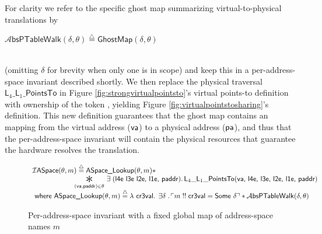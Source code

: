 For clarity we refer to the specific ghost map summarizing virtual-to-physical translations by \\
\centerline{$\mathcal{A}\textsf{bsPTableWalk}(\delta,\theta) \stackrel{\triangle}{=} \mathsf{GhostMap}(\delta,\theta)$}\\
(omitting $\delta$ for brevity when only one is in scope)
and keep this in a per-address-space invariant described shortly.
We then replace the physical traversal
 $\textsf{L}_{4}\_\textsf{L}_{1}\_\textsf{PointsTo}$ in Figure \ref{fig:strongvirtualpointsto}'s virtual points-to definition
with ownership of the token \ghostmaptoken{\delta}{\vaddr}{\paddr}, %
yielding Figure \ref{fig:virtualpointstosharing}'s definition.
This new definition guarantees that the ghost map contains an mapping from the virtual address ($\mathsf{va}$) to a physical address ($\textsf{pa}$),
and thus that the per-address-space invariant will contain the physical resources that guarantee the hardware resolves the translation.

  \begin{figure*}
  \footnotesize
\centerline{$
\begin{array}{l}
  \mathcal{I}\textsf{ASpace}(\ptablestore,m)\stackrel{\triangle}{=} \textsf{ASpace\_Lookup}(\ptablestore,m) \ast \\
 \qquad\qquad\qquad \bigast{(\vaddr, \textsf{paddr})\in \ptablestore}{\exists\;(\textsf{l4e l3e l2e, l1e, paddr})\ldotp \textsf{L}_{4}\_\textsf{L}_{1}\_\textsf{PointsTo}(\vaddr\textsf{, l4e, l3e, l2e, l1e, paddr})} \\
  \textsf{ where } 
   \textsf{ASpace\_Lookup} (\ptablestore,m) \stackrel{\triangle}{=} \lambda\textsf{ cr3val} \ldotp \; \exists \gammaPred \; \ldotp \ulcorner m \; !!\; \textsf{cr3val} = \textsf{Some } \gammaPred \urcorner \ast
    \ptableabswalk{\delta,\theta}
\end{array}
$}
\vspace{-1em}
\caption{Per-address-space invariant with a fixed global map of address-space names $m$}
  \label{fig:peraspaceinvariant}
\vspace{-1em}
  \end{figure*}


